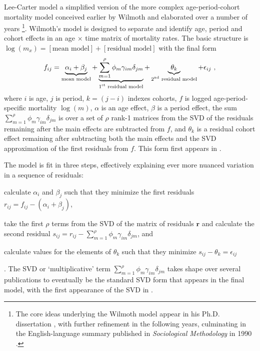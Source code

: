 \documentclass[11pt]{article}
\newcommand{\mbf}{\mathbf}
\begin{document}
 Lee-Carter model  a simplified version of the more complex age-period-cohort mortality model conceived earlier by Wilmoth and elaborated over a number of years  \citep{wilmoth1987simple, wilmoth1989quand, wilmoth1990variation}\footnote{The core ideas underlying the Wilmoth model appear in his Ph.D. dissertation \citep{wilmoth1988Phd}, with further refinement in the following years, culminating in the English-language summary published in \textit{Sociological Methodology} in 1990 \citep{wilmoth1990variation}.}.  Wilmoth's model is designed to separate and identify age, period and cohort effects in an age $\times$ time matrix of mortality rates.  The basic structure is $\log(m_x) = [\mbox{mean model}] + [\mbox{residual model}]$ with the final form %
%
\begin{align}
f_{ij} = \underbrace{\alpha_i + \beta_j}_{\substack{\text{mean model}}} + \underbrace{\sum_{m=1}^\rho \phi_m \gamma_{im} \delta_{jm}}_{\substack{\text{1\textsuperscript{st} residual model}}} + \underbrace{\theta_k}_{\substack{\text{2\textsuperscript{nd} residual model}}} +\epsilon_{ij} \ , 
\label{eq:wilmoth}
\end{align} %
%
where $i$ is age, $j$ is period, $k = (j-i)$ indexes cohorts, $f$ is logged age-period-specific mortality $\log(m)$, $\alpha$ is an age effect, $\beta$ is a period effect, the sum $\sum_{m=1}^\rho \phi_{m} \gamma_{im} \delta_{jm}$ is over a set of $\rho$ rank-1 matrices from the SVD of the residuals remaining after the main effects are subtracted from $f$, and $\theta_k$ is a residual cohort effect remaining after subtracting both the main effects and the SVD approximation of the first residuals from $f$.  This form first appears in \cite{wilmoth1989quand}. 

The model is fit in three steps, effectively explaining ever more nuanced variation in a sequence of residuals:  %
\begin{enumerate*}[label=\arabic*)]
\item calculate $\alpha_i$ and $\beta_j$ such that they minimize the first residuals $r_{ij} = f_{ij} - (\alpha_i + \beta_j)$, 
\item take the first $\rho$ terms from the SVD of the matrix of residuals $\mbf{r}$ and calculate the second residual $s_{ij} = r_{ij} - \sum_{m=1}^\rho \phi_m \gamma_{im} \delta_{jm}$, and 
\item calculate values for the elements of $\theta_k$ such that they minimize $s_{ij} - \theta_k = \epsilon_{ij}$
\end{enumerate*}.  
The SVD or `multiplicative' term  $\sum_{m=1}^\rho \phi_m \gamma_{im} \delta_{jm}$ takes shape over several publications \citep{wilmoth1987simple, wilmoth1989quand, wilmoth1990variation} to eventually be the standard SVD form that appears in the final model, with the first appearance of the SVD in \cite{wilmoth1989quand}.
\end{document}
